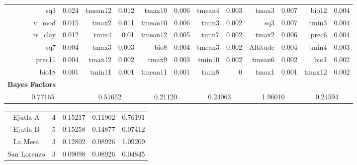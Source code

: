 \documentclass[11pt]{article}
\begin{document}
\begin{linenumbers}
\begin{flushleft}
\begin{table}[htbp]
\begin{tabular}{rrrrrrrrrrrr}
    sq3   & 0.024 & tmean12 & 0.012 & tmax10 & 0.006 & tmean4 & 0.003 & tmax3 & 0.007 & bio12 & 0.004 \\
    v\_mod & 0.015 & tmax2 & 0.011 & tmean10 & 0.006 & tmin3 & 0.002 & sq3   & 0.007 & tmin3 & 0.004 \\
    ts\_clay & 0.012 & tmin4 & 0.01  & tmean12 & 0.005 & tmin7 & 0.002 & tmax2 & 0.006 & prec6 & 0.004 \\
    sq7   & 0.004 & tmax3 & 0.003 & bio8  & 0.004 & tmean3 & 0.002 & Altitude & 0.004 & tmin4 & 0.003 \\
    prec11 & 0.004 & tmax12 & 0.002 & tmax9 & 0.003 & tmin10 & 0.002 & tmean6 & 0.002 & bio1  & 0.002 \\
    bio18 & 0.001 & tmin11 & 0.001 & tmean11 & 0.001 & tmin8 & 0     & tmax1 & 0.001 & tmax12 & 0.002 \\
    \textbf{Bayes Factors} &       &       &       &       &       &       &       &       &       &       &  \\
    \multicolumn{2}{c}{0.77165} & \multicolumn{2}{c}{0.51652} & \multicolumn{2}{c}{0.21120} & \multicolumn{2}{c}{0.24063} & \multicolumn{2}{c}{1.96010} & \multicolumn{2}{c}{0.24594} \\
    \bottomrule
    \end{tabular}%
  \label{TableS3BayEnv}%
\end{table}%

\begin{table}[htbp]
  \centering
    \begin{tabular}{ccccc}
    \toprule
    \midrule
    Ejutla A & 4     & 0.15217 & 0.11902 & 0.76191 \\
    Ejutla B & 5     & 0.15258 & 0.14877 & 0.07412 \\
    La Mesa & 3     & 0.12802 & 0.08926 & 1.09209 \\
    San Lorenzo & 3     & 0.09098 & 0.08926 & 0.04845 \\
    \bottomrule
    \end{tabular}%
  \label{TableS4DiversitySNP}%
\end{table}%

\end{flushleft}

\end{linenumbers}
\end{document}
